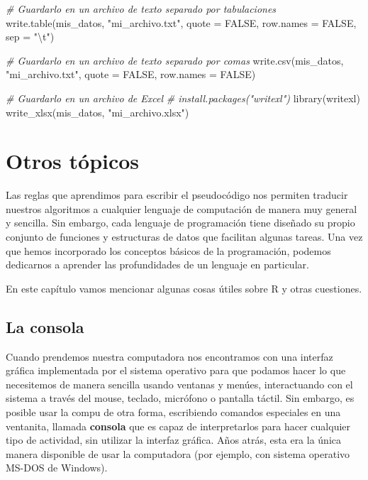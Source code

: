 \documentclass[
]{book}
\newenvironment{Shaded}{\begin{snugshade}}{\end{snugshade}}
\newcommand{\AttributeTok}[1]{\textcolor[rgb]{0.77,0.63,0.00}{#1}}
\newcommand{\CommentTok}[1]{\textcolor[rgb]{0.56,0.35,0.01}{\textit{#1}}}
\newcommand{\ConstantTok}[1]{\textcolor[rgb]{0.00,0.00,0.00}{#1}}
\newcommand{\FunctionTok}[1]{\textcolor[rgb]{0.00,0.00,0.00}{#1}}
\newcommand{\NormalTok}[1]{#1}
\newcommand{\SpecialCharTok}[1]{\textcolor[rgb]{0.00,0.00,0.00}{#1}}
\newcommand{\StringTok}[1]{\textcolor[rgb]{0.31,0.60,0.02}{#1}}
\begin{document}
\begin{Shaded}
\begin{Highlighting}[]
\CommentTok{\# Guardarlo en un archivo de texto separado por tabulaciones}
\FunctionTok{write.table}\NormalTok{(mis\_datos, }\StringTok{"mi\_archivo.txt"}\NormalTok{, }\AttributeTok{quote =} \ConstantTok{FALSE}\NormalTok{, }\AttributeTok{row.names =} \ConstantTok{FALSE}\NormalTok{, }\AttributeTok{sep =} \StringTok{"}\SpecialCharTok{\textbackslash{}t}\StringTok{"}\NormalTok{)}

\CommentTok{\# Guardarlo en un archivo de texto separado por comas}
\FunctionTok{write.csv}\NormalTok{(mis\_datos, }\StringTok{"mi\_archivo.txt"}\NormalTok{, }\AttributeTok{quote =} \ConstantTok{FALSE}\NormalTok{, }\AttributeTok{row.names =} \ConstantTok{FALSE}\NormalTok{)}

\CommentTok{\# Guardarlo en un archivo de Excel}
\CommentTok{\# install.packages("writexl")}
\FunctionTok{library}\NormalTok{(writexl)}
\FunctionTok{write\_xlsx}\NormalTok{(mis\_datos, }\StringTok{"mi\_archivo.xlsx"}\NormalTok{)}
\end{Highlighting}
\end{Shaded}

\hypertarget{otros-tuxf3picos}{%
\chapter{Otros tópicos}\label{otros-tuxf3picos}}

Las reglas que aprendimos para escribir el pseudocódigo nos permiten traducir nuestros algoritmos a cualquier lenguaje de computación de manera muy general y sencilla. Sin embargo, cada lenguaje de programación tiene diseñado su propio conjunto de funciones y estructuras de datos que facilitan algunas tareas. Una vez que hemos incorporado los conceptos básicos de la programación, podemos dedicarnos a aprender las profundidades de un lenguaje en particular.

En este capítulo vamos mencionar algunas cosas útiles sobre R y otras cuestiones.

\hypertarget{la-consola}{%
\section{La consola}\label{la-consola}}

Cuando prendemos nuestra computadora nos encontramos con una interfaz gráfica implementada por el sistema operativo para que podamos hacer lo que necesitemos de manera sencilla usando ventanas y menúes, interactuando con el sistema a través del mouse, teclado, micrófono o pantalla táctil. Sin embargo, es posible usar la compu de otra forma, escribiendo comandos especiales en una ventanita, llamada \textbf{consola} que es capaz de interpretarlos para hacer cualquier tipo de actividad, sin utilizar la interfaz gráfica. Años atrás, esta era la única manera disponible de usar la computadora (por ejemplo, con sistema operativo MS-DOS de Windows).
\end{document}
